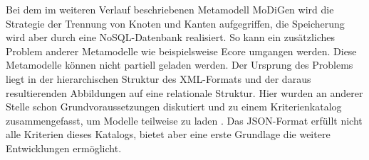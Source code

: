 Bei dem im weiteren Verlauf beschriebenen Metamodell MoDiGen wird die Strategie der Trennung von Knoten und Kanten aufgegriffen, die Speicherung wird aber durch eine NoSQL-Datenbank realisiert. So kann ein zusätzliches Problem anderer Metamodelle wie beispielsweise Ecore umgangen werden. Diese Metamodelle können nicht partiell geladen werden. Der Ursprung des Problems liegt in der hierarchischen Struktur des XML-Formats und der daraus resultierenden Abbildungen auf eine relationale Struktur. Hier wurden an anderer Stelle schon Grundvoraussetzungen diskutiert und zu einem Kriterienkatalog zusammengefasst, um Modelle teilweise zu laden \cite{kolovos2013research}. Das JSON-Format erfüllt nicht alle Kriterien dieses Katalogs, bietet aber eine erste Grundlage die weitere Entwicklungen ermöglicht.